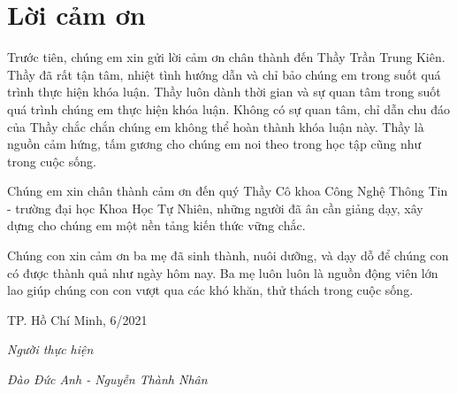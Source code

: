 \chapter*{Lời cảm ơn}
\label{thanks}
\setlength{\parindent}{6.5ex}

Trước tiên, chúng em xin gửi lời cảm ơn chân thành đến Thầy Trần Trung Kiên.
Thầy đã rất tận tâm, nhiệt tình hướng dẫn và chỉ bảo chúng em trong suốt quá trình thực hiện khóa luận. 
Thầy luôn dành thời gian và sự quan tâm trong suốt quá trình chúng em thực hiện khóa luận.
Không có sự quan tâm, chỉ dẫn chu đáo của Thầy chắc chắn chúng em không thể hoàn thành khóa luận này. Thầy là nguồn cảm hứng, tấm gương cho chúng em noi theo trong học tập cũng như trong cuộc sống.

Chúng em xin chân thành cảm ơn đến quý Thầy Cô khoa Công Nghệ Thông Tin - trường đại học Khoa Học Tự Nhiên, những người đã ân cần giảng dạy, xây dựng cho chúng em một nền tảng kiến thức vững chắc.

Chúng con xin cảm ơn ba mẹ đã sinh thành, nuôi dưỡng, và dạy dỗ để chúng con có được thành quả như ngày hôm nay. Ba mẹ luôn luôn là nguồn động viên lớn lao giúp chúng con con vượt qua các khó khăn, thử thách trong cuộc sống.


\hfill TP. Hồ Chí Minh, 6/2021

\hfill \textit{Người thực hiện}

\hfill \textit{Đào Đức Anh - Nguyễn Thành Nhân}
